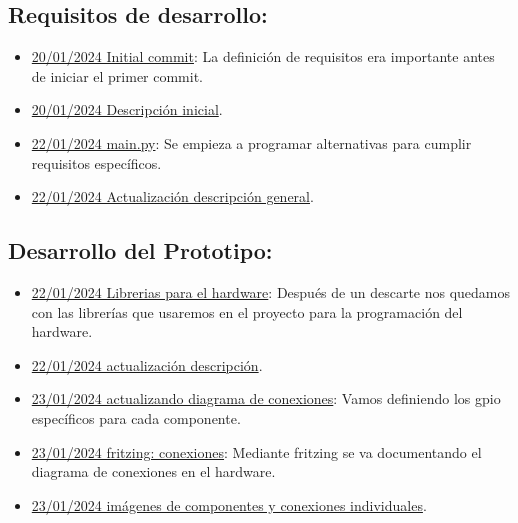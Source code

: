 \subsection{Requisitos de desarrollo:}
\begin{itemize}
\item \href{https://github.com/JLCaballeroMQ/Proyecto_TFG_UBU_23_24/tree/3ccbee3601f8daa05b77ecaaee85e79b8cc5096d}{20/01/2024 Initial commit}: La definición de requisitos era importante antes de iniciar el primer commit.
\item \href{https://github.com/JLCaballeroMQ/Proyecto_TFG_UBU_23_24/tree/ee2371b9cea962cccfbe2fbdd36a4b063335fbbb}{20/01/2024 Descripción inicial}.
\item \href{https://github.com/JLCaballeroMQ/Proyecto_TFG_UBU_23_24/tree/2f7dd2a4db33f9fae777dc720ab7f9d36baa93ba}{22/01/2024 main.py}: Se empieza a programar alternativas para cumplir requisitos específicos.
\item \href{https://github.com/JLCaballeroMQ/Proyecto_TFG_UBU_23_24/tree/c513caeb06e930783d92673e138b5bcb5374fa9a}{22/01/2024 Actualización descripción general}.
\end{itemize}

\subsection{Desarrollo del Prototipo:}
\begin{itemize}
\item \href{https://github.com/JLCaballeroMQ/Proyecto_TFG_UBU_23_24/tree/a7cc3b37273cf2a0569f367426a830c4cd67be41}{22/01/2024 Librerias para el hardware}: Después de un descarte nos quedamos con las librerías que usaremos en el proyecto para la programación del hardware.
\item \href{https://github.com/JLCaballeroMQ/Proyecto_TFG_UBU_23_24/tree/f0508f25c715b820f8c66d81d5a37358dcef4188}{22/01/2024 actualización descripción}.
\item \href{https://github.com/JLCaballeroMQ/Proyecto_TFG_UBU_23_24/tree/c211b460fad76fb0b5105ad3b4b82a99f4d6ff1d}{23/01/2024 actualizando diagrama de conexiones}: Vamos definiendo los gpio específicos para cada componente.
\item \href{https://github.com/JLCaballeroMQ/Proyecto_TFG_UBU_23_24/tree/4b8af308869df57dfe64a1a22c0d75322a33b546}{23/01/2024 fritzing: conexiones}: Mediante fritzing se va documentando el diagrama de conexiones en el hardware.
\item \href{https://github.com/JLCaballeroMQ/Proyecto_TFG_UBU_23_24/tree/a4770260543238966607c17d85058db074cd156f}{23/01/2024 imágenes de componentes y conexiones individuales}.
\end{itemize}


